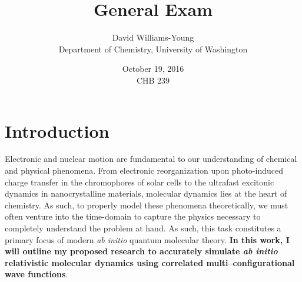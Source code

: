 \documentclass[12pt]{article}
\title{General Exam}
\date{October 19, 2016 \\ CHB 239}
\author{David Williams-Young\\ Department of Chemistry, University of Washington}
\begin{document}
\maketitle


\newpage
\section{Introduction}

Electronic and nuclear motion are fundamental to our understanding of chemical
and physical phenomena. From electronic reorganization upon photo-induced charge
transfer in the chromophores of solar cells to the ultrafast excitonic dynamics
in nanocrystalline materials, molecular dynamics lies at the heart of chemistry.
As such, to properly model these phenomena theoretically, we must often venture
into the time-domain to capture the physics necessary to completely understand
the problem at hand. As such, this task constitutes a primary focus of modern
\emph{ab initio} quantum molecular theory. \textbf{In this work, I will outline
my proposed research to accurately simulate \emph{ab initio} relativistic
molecular dynamics using correlated multi--configurational wave functions}.
\end{document}
